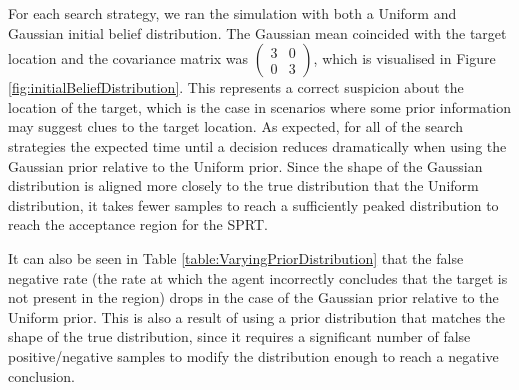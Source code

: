 For each search strategy, we ran the simulation with both a Uniform and Gaussian initial belief distribution. The Gaussian mean coincided with the target location and the covariance matrix was $\begin{pmatrix} 3 & 0\\ 0 & 3\end{pmatrix}$, which is visualised in Figure \ref{fig:initialBeliefDistribution}. This represents a correct suspicion about the location of the target, which is the case in scenarios where some prior information may suggest clues to the target location. As expected, for all of the search strategies the expected time until a decision reduces dramatically when using the Gaussian prior relative to the Uniform prior. 
Since the shape of the Gaussian distribution is aligned more closely to the true distribution that the Uniform distribution, it takes fewer samples to reach a sufficiently peaked distribution to reach the acceptance region for the SPRT. 

\par It can also be seen in Table \ref{table:VaryingPriorDistribution} that the false negative rate (the rate at which the agent incorrectly concludes that the target is not present in the region) drops in the case of the Gaussian prior relative to the Uniform prior. This is also a result of using a prior distribution that matches the shape of the true distribution, since it requires a significant number of false positive/negative samples to modify the distribution enough to reach a negative conclusion.


   



